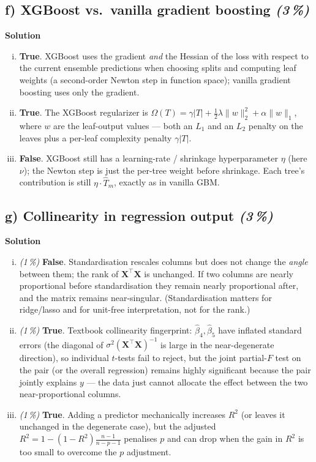 \documentclass[11pt,a4paper]{article}
\newcommand{\subpoints}[1]{\textit{(#1\,\%)}}
\newcommand{\sol}{\noindent\textbf{Solution}}
\begin{document}
\subsection*{f) XGBoost vs.\ vanilla gradient boosting \subpoints{3}}

\sol{}
\begin{enumerate}[(i)]
  \item \textbf{True}. XGBoost uses the gradient \emph{and} the Hessian of the loss with respect to
        the current ensemble predictions when choosing splits and computing leaf weights (a
        second-order Newton step in function space); vanilla gradient boosting uses only the
        gradient.
  \item \textbf{True}. The XGBoost regularizer is
        $\Omega(T) = \gamma|T| + \tfrac{1}{2}\lambda\|w\|_2^2 + \alpha\|w\|_1$,
        where $w$ are the leaf-output values --- both an $L_1$ and an $L_2$ penalty on the leaves
        plus a per-leaf complexity penalty $\gamma|T|$.
  \item \textbf{False}. XGBoost still has a learning-rate / shrinkage hyperparameter $\eta$ (here
        $\nu$); the Newton step is just the per-tree weight before shrinkage. Each tree's
        contribution is still $\eta \cdot \hat T_m$, exactly as in vanilla GBM.
\end{enumerate}

\subsection*{g) Collinearity in regression output \subpoints{3}}

\sol{}
\begin{enumerate}[(i)]
  \item \subpoints{1} \textbf{False}. Standardisation rescales columns but does not change the
        \emph{angle} between them; the rank of $\mathbf{X}^\top\mathbf{X}$ is unchanged. If two
        columns are nearly proportional before standardisation they remain nearly proportional
        after, and the matrix remains near-singular. (Standardisation matters for ridge/lasso and
        for unit-free interpretation, not for the rank.)
  \item \subpoints{1} \textbf{True}. Textbook collinearity fingerprint: $\hat\beta_4, \hat\beta_5$
        have inflated standard errors (the diagonal of $\sigma^2(\mathbf{X}^\top\mathbf{X})^{-1}$ is
        large in the near-degenerate direction), so individual $t$-tests fail to reject, but the
        joint partial-$F$ test on the pair (or the overall regression) remains highly significant
        because the pair jointly explains $y$ --- the data just cannot allocate the effect between
        the two near-proportional columns.
  \item \subpoints{1} \textbf{True}. Adding a predictor mechanically increases $R^2$ (or leaves it
        unchanged in the degenerate case), but the adjusted $R^2 = 1 - (1-R^2)\frac{n-1}{n-p-1}$
        penalises $p$ and can drop when the gain in $R^2$ is too small to overcome the $p$
        adjustment.
\end{enumerate}
\end{document}
